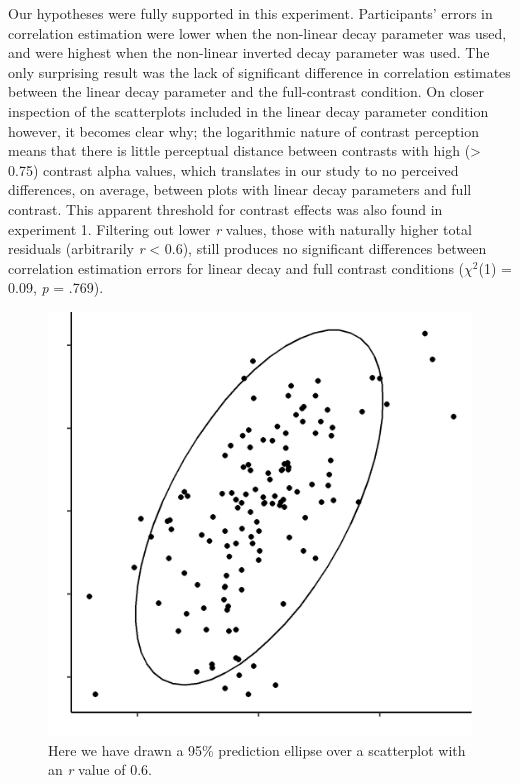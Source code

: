 \documentclass[preprint, 3p,
authoryear]{elsarticle} %
\begin{document}
Our hypotheses were fully supported in this experiment. Participants'
errors in correlation estimation were lower when the non-linear decay
parameter was used, and were highest when the non-linear inverted decay
parameter was used. The only surprising result was the lack of
significant difference in correlation estimates between the linear decay
parameter and the full-contrast condition. On closer inspection of the
scatterplots included in the linear decay parameter condition however,
it becomes clear why; the logarithmic nature of contrast perception
\citep{varshney_2013, fechner_1948} means that there is little
perceptual distance between contrasts with high (\textgreater{} 0.75)
contrast alpha values, which translates in our study to no perceived
differences, on average, between plots with linear decay parameters and
full contrast. This apparent threshold for contrast effects was also
found in experiment 1. Filtering out lower \emph{r} values, those with
naturally higher total residuals (arbitrarily \emph{r} \textless{} 0.6),
still produces no significant differences between correlation estimation
errors for linear decay and full contrast conditions (\(\chi^2\)(1) =
0.09, \emph{p} = .769).

\begin{figure}

\includegraphics[width=0.5\linewidth]{images/prediction_ellipse} \hfill{}

\caption{\label{prediction-ellipse}Here we have drawn a 95\% prediction ellipse over a scatterplot with an \textit{r} value of 0.6.}\label{fig:prediction-ellipse}
\end{figure}
\end{document}
